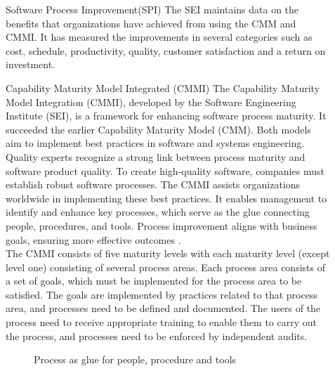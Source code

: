 \documentclass[final]{beamer}
\newlength{\sepwidth}
\newlength{\colwidth}
\newcommand{\separatorcolumn}{\begin{column}{\sepwidth}\end{column}}
\begin{document}
\begin{frame}[t]
\begin{columns}[t]
\begin{column}{\colwidth}
\begin{block}{Software Process Improvement(SPI)}
  	The SEI maintains data on the beneﬁts that organizations have achieved from using the CMM and CMMI. It has measured the improvements in several categories such as cost, schedule, productivity, quality, customer satisfaction and a return on investment.
  	\begin{block}{Capability Maturity Model Integrated (CMMI)}
  		The Capability Maturity Model Integration (CMMI), developed by the Software Engineering Institute (SEI), is a framework for enhancing software process maturity. It succeeded the earlier Capability Maturity Model (CMM). Both models aim to implement best practices in software and systems engineering. Quality experts recognize a strong link between process maturity and software product quality. To create high-quality software, companies must establish robust software processes. The CMMI assists organizations worldwide in implementing these best practices. It enables management to identify and enhance key processes, which serve as the glue connecting people, procedures, and tools. Process improvement aligns with business goals, ensuring more effective outcomes .\\
  		The CMMI consists of ﬁve maturity levels with each maturity level (except level one) consisting of several process areas. Each process area consists of a set of goals, which must be implemented for the process area to be satisﬁed. The goals are implemented by practices related to that process area, and processes need to be deﬁned and documented. The users of the process need to receive appropriate training to enable them to carry out the process, and processes need to be enforced by independent audits.
  		{\begin{figure}
  				\caption{Process as glue for people, procedure and tools}
  				\label{process}
  		\end{figure}}
  	\end{block}
  \end{block}
\end{column}
\separatorcolumn
\begin{column}{\colwidth}

\end{column}
\end{columns}
\end{frame}
\end{document}

